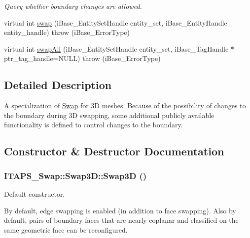 \begin{DoxyCompactItemize}
\begin{DoxyCompactList}\small\item\em Query whether boundary changes are allowed. \item\end{DoxyCompactList}\item 
virtual int \hyperlink{class_i_t_a_p_s___swap_1_1_swap3_d_a82a135da16b4ef6e5ff36f8293cc450c}{swap} (iBase\_\-EntitySetHandle entity\_\-set, iBase\_\-EntityHandle entity\_\-handle)  throw (iBase\_\-ErrorType)
\item 
virtual int \hyperlink{class_i_t_a_p_s___swap_1_1_swap3_d_a139a400102ad7039fcc74d92d72dea27}{swapAll} (iBase\_\-EntitySetHandle entity\_\-set, iBase\_\-TagHandle $\ast$ptr\_\-tag\_\-handle=NULL)  throw (iBase\_\-ErrorType)
\end{DoxyCompactItemize}


\subsection{Detailed Description}
A specialization of \hyperlink{class_i_t_a_p_s___swap_1_1_swap}{Swap} for 3D meshes. Because of the possibility of changes to the boundary during 3D swapping, some additional publicly available functionality is defined to control changes to the boundary. 

\subsection{Constructor \& Destructor Documentation}
\hypertarget{class_i_t_a_p_s___swap_1_1_swap3_d_acf6445ad45f957369eb20b0671bfd5ba}{
\subsubsection[{Swap3D}]{\setlength{\rightskip}{0pt plus 5cm}ITAPS\_\-Swap::Swap3D::Swap3D ()}}
\label{class_i_t_a_p_s___swap_1_1_swap3_d_acf6445ad45f957369eb20b0671bfd5ba}


Default constructor. 

By default, edge swapping is enabled (in addition to face swapping). Also by default, pairs of boundary faces that are nearly coplanar and classified on the same geometric face can be reconfigured. 

